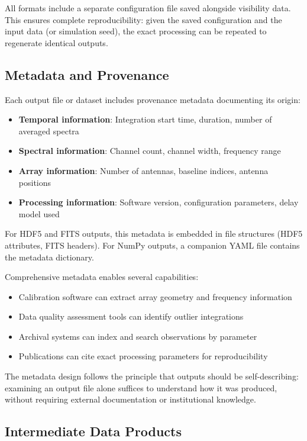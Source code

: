 All formats include a separate configuration file saved alongside visibility data. This ensures complete reproducibility: given the saved configuration and the input data (or simulation seed), the exact processing can be repeated to regenerate identical outputs.

\subsection{Metadata and Provenance}

Each output file or dataset includes provenance metadata documenting its origin:

\begin{itemize}
    \item \textbf{Temporal information}: Integration start time, duration, number of averaged spectra
    \item \textbf{Spectral information}: Channel count, channel width, frequency range
    \item \textbf{Array information}: Number of antennas, baseline indices, antenna positions
    \item \textbf{Processing information}: Software version, configuration parameters, delay model used
\end{itemize}

For HDF5 and FITS outputs, this metadata is embedded in file structures (HDF5 attributes, FITS headers). For NumPy outputs, a companion YAML file contains the metadata dictionary.

Comprehensive metadata enables several capabilities:

\begin{itemize}
    \item Calibration software can extract array geometry and frequency information
    \item Data quality assessment tools can identify outlier integrations
    \item Archival systems can index and search observations by parameter
    \item Publications can cite exact processing parameters for reproducibility
\end{itemize}

The metadata design follows the principle that outputs should be self-describing: examining an output file alone suffices to understand how it was produced, without requiring external documentation or institutional knowledge.

\subsection{Intermediate Data Products}

